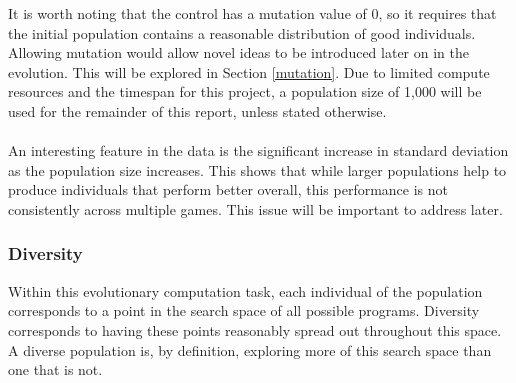 \documentclass{article}
\begin{document}
It is worth noting that the control has a mutation value of 0, so it requires that the initial population contains a reasonable distribution of good individuals. Allowing mutation would allow novel ideas to be introduced later on in the evolution. This will be explored in Section \ref{mutation}.
Due to limited compute resources and the timespan for this project, a population size of 1,000 will be used for the remainder of this report, unless stated otherwise.
\\\\
An interesting feature in the data is the significant increase in standard deviation as the population size increases. This shows that while larger populations help to produce individuals that perform better overall, this performance is not consistently across multiple games. This issue will be important to address later.

\subsubsection{Diversity}
Within this evolutionary computation task, each individual of the population corresponds to a point in the search space of all possible programs. %
Diversity corresponds to having these points reasonably spread out throughout this space. A diverse population is, by definition, exploring more of this search space than one that is not. %
\end{document}
